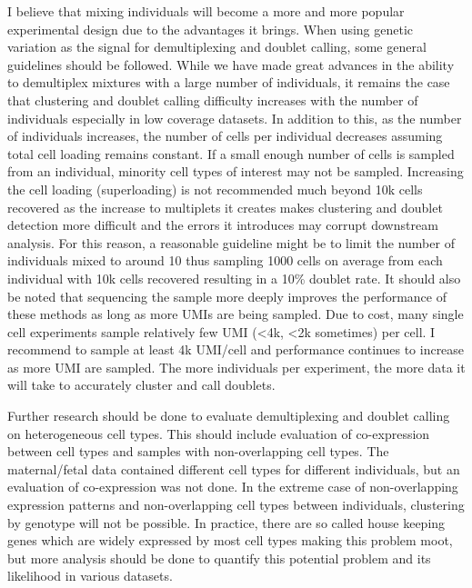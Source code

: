 \par{
I believe that mixing individuals will become a more and more popular experimental design due to the advantages it brings. When using genetic variation as the signal for demultiplexing and doublet calling, some general guidelines should be followed. While we have made great advances in the ability to demultiplex mixtures with a large number of individuals, it remains the case that clustering and doublet calling difficulty increases with the number of individuals especially in low coverage datasets. In addition to this, as the number of individuals increases, the number of cells per individual decreases assuming total cell loading remains constant. If a small enough number of cells is sampled from an individual, minority cell types of interest may not be sampled. Increasing the cell loading (superloading) is not recommended much beyond 10k cells recovered as the increase to multiplets it creates makes clustering and doublet detection more difficult and the errors it introduces may corrupt downstream analysis. For this reason, a reasonable guideline might be to limit the number of individuals mixed to around 10 thus sampling 1000 cells on average from each individual with 10k cells recovered resulting in a 10\% doublet rate. It should also be noted that sequencing the sample more deeply improves the performance of these methods as long as more UMIs are being sampled. Due to cost, many single cell experiments sample relatively few UMI (<4k, <2k sometimes) per cell. I recommend to sample at least 4k UMI/cell and performance continues to increase as more UMI are sampled. The more individuals per experiment, the more data it will take to accurately cluster and call doublets.
}

\par{
Further research should be done to evaluate demultiplexing and doublet calling on heterogeneous cell types. This should include evaluation of co-expression between cell types and samples with non-overlapping cell types. The maternal/fetal data contained different cell types for different individuals, but an evaluation of co-expression was not done. In the extreme case of non-overlapping expression patterns and non-overlapping cell types between individuals, clustering by genotype will not be possible. In practice, there are so called house keeping genes which are widely expressed by most cell types making this problem moot, but more analysis should be done to quantify this potential problem and its likelihood in various datasets.
}


